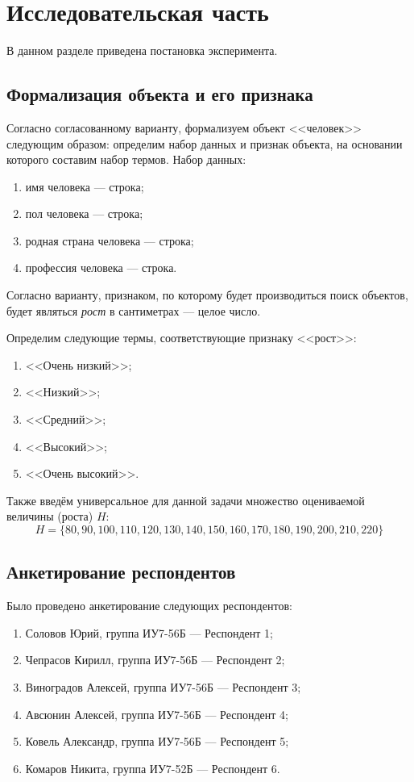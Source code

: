 \chapter{Исследовательская часть}

В данном разделе приведена постановка эксперимента.

\section{Формализация объекта и его признака}
\label{formal}
Согласно согласованному варианту, формализуем объект <<человек>> следующим образом: определим набор данных и признак объекта, на основании которого составим набор термов.
Набор данных:
\begin{enumerate}[label=\arabic*)]
	\item имя человека --- строка;
	\item пол человека --- строка;
	\item родная страна человека --- строка;
	\item профессия человека --- строка.
\end{enumerate}
Согласно варианту, признаком, по которому будет производиться поиск объектов, будет являться \textit{рост} в сантиметрах --- целое число.

Определим следующие термы, соответствующие признаку <<рост>>:
\begin{enumerate}[label=\arabic*)]
	\item <<Очень низкий>>;
	\item <<Низкий>>;
	\item <<Средний>>;
	\item <<Высокий>>;
	\item <<Очень высокий>>.
\end{enumerate}

Также введём универсальное для данной задачи множество оцениваемой величины (роста) $H$:
\begin{equation}
	\label{eq:h}
	H = \{80, 90, 100, 110, 120, 130, 140, 150, 160, 170, 180, 190, 200, 210, 220\}
\end{equation}

\section{Анкетирование респондентов}

Было проведено анкетирование следующих респондентов:
\begin{enumerate}[label=\arabic*)]
	\item Соловов Юрий, группа ИУ7-56Б --- Респондент 1;
	\item Чепрасов Кирилл, группа ИУ7-56Б --- Респондент 2;
	\item Виноградов Алексей, группа ИУ7-56Б --- Респондент 3;
	\item Авсюнин Алексей, группа ИУ7-56Б --- Респондент 4;
	\item Ковель Александр, группа ИУ7-56Б --- Респондент 5;
	\item Комаров Никита, группа ИУ7-52Б --- Респондент 6.
\end{enumerate}

